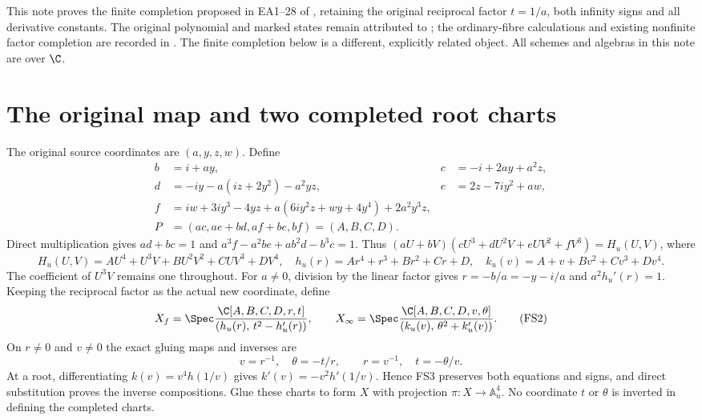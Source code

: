 This note proves the finite completion proposed in EA1--28 of
\cite{ExceptionalAtlas}, retaining the original reciprocal factor
$t=1/a$, both infinity signs and all derivative constants.
The original polynomial and marked states remain attributed
to \cite{ES488}; the ordinary-fibre calculations and existing
nonfinite factor completion are recorded in \cite{Fable029}.
The finite completion below is a different, explicitly related
object. All schemes and algebras in this note are over $\C$.

\section{The original map and two completed root charts}
The original source coordinates are $(a,y,z,w)$. Define
\begin{align}
b&=i+ay,&c&=-i+2ay+a^2z,\nonumber\\
d&=-iy-a(iz+2y^2)-a^2yz,&e&=2z-7iy^2+aw,\nonumber\\
f&=iw+3iy^3-4yz+a(6iy^2z+wy+4y^4)+2a^2y^3z,\nonumber\\
P&=(ac,ae+bd,af+be,bf)=(A,B,C,D).
\tag{FS1}
\end{align}
Direct multiplication gives $ad+bc=1$ and
$a^3f-a^2be+ab^2d-b^3c=1$. Thus
$(aU+bV)(cU^3+dU^2V+eUV^2+fV^3)=H_u(U,V)$, where
\[
H_u(U,V)=AU^4+U^3V+BU^2V^2+CUV^3+DV^4,\quad
h_u(r)=Ar^4+r^3+Br^2+Cr+D,\quad
k_u(v)=A+v+Bv^2+Cv^3+Dv^4 .
\]
The coefficient of $U^3V$ remains one throughout.
For $a\ne0$, division by the linear factor gives
$r=-b/a=-y-i/a$ and $a^2h_u'(r)=1$.
Keeping the reciprocal factor as the actual new coordinate,
define
\begin{equation}
X_f=\Spec\frac{\C[A,B,C,D,r,t]}{(h_u(r),\,t^2-h_u'(r))},
\qquad
X_\infty=\Spec\frac{\C[A,B,C,D,v,\theta]}
 {(k_u(v),\,\theta^2+k_u'(v))}.
\tag{FS2}
\end{equation}
On $r\ne0$ and $v\ne0$ the exact gluing maps and inverses are
\begin{equation}
v=r^{-1},\quad\theta=-t/r,\qquad
r=v^{-1},\quad t=-\theta/v .
\tag{FS3}
\end{equation}
At a root, differentiating $k(v)=v^4h(1/v)$ gives
$k'(v)=-v^2h'(1/v)$. Hence FS3 preserves both equations
and signs, and direct substitution proves the inverse
compositions. Glue these charts to form $X$ with projection
$\pi:X\to\mathbb A^4_u$. No coordinate $t$ or $\theta$ is
inverted in defining the completed charts.

